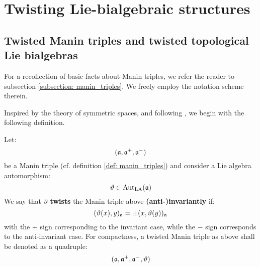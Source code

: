 \section{Twisting Lie-bialgebraic structures}
    \subsection{Twisted Manin triples and twisted topological Lie bialgebras}
        For a recollection of basic facts about Manin triples, we refer the reader to subsection \ref{subsection: manin_triples}. We freely employ the notation scheme therein.

        Inspired by the theory of symmetric spaces, and following \cite{belliard_crampe_coideal_subalgebras_from_twisted_manin_triples}, we begin with the following definition.
        \begin{definition} \label{def: twisted_manin_triples}
            Let:
                $$(\mathfrak{a}, \mathfrak{a}^+, \mathfrak{a}^-)$$
            be a Manin triple (cf. definition \ref{def: manin_triples}) and consider a Lie algebra automorphism:
                $$\vartheta \in \operatorname{Aut}_{\mathrm{LA}}(\mathfrak{a})$$
            We say that $\vartheta$ \textbf{twists} the Manin triple above \textbf{(anti-)invariantly} if:
                $$(\vartheta(x), y)_{\mathfrak{a}} = \pm (x, \vartheta(y))_{\mathfrak{a}}$$
            with the $+$ sign corresponding to the invariant case, while the $-$ sign corresponds to the anti-invariant case. For compactness, a twisted Manin triple as above shall be denoted as a quadruple:
                $$(\mathfrak{a}, \mathfrak{a}^+, \mathfrak{a}^-, \vartheta)$$
        \end{definition}

